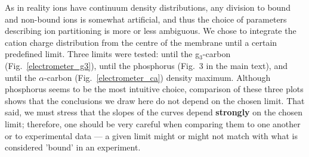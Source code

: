 \documentclass[twoside,twocolumn,9pt]{article}
\begin{document}
As in reality ions have continuum density distributions, any division to bound and non-bound ions is somewhat artificial,
and thus the choice of parameters describing ion partitioning is more or less ambiguous.
We chose to integrate the cation charge distribution from the centre of the membrane until a certain predefined limit. Three limits were tested:
until the g$_3$-carbon (Fig.~\ref{electrometer_g3}), until the phosphorus (Fig.~3 in the main text), and until the $\alpha$-carbon (Fig.~\ref{electrometer_ca}) density maximum. Although phosphorus seems to be the most intuitive choice, comparison of these three plots shows that the conclusions we draw here do not depend on the chosen limit.
That said, we must stress that the slopes of the curves depend {\bf strongly} on the chosen limit; therefore, one should be very careful when comparing them to one another or to experimental data --- a given limit might or might not match with what is considered 'bound' in an experiment.
\end{document}

